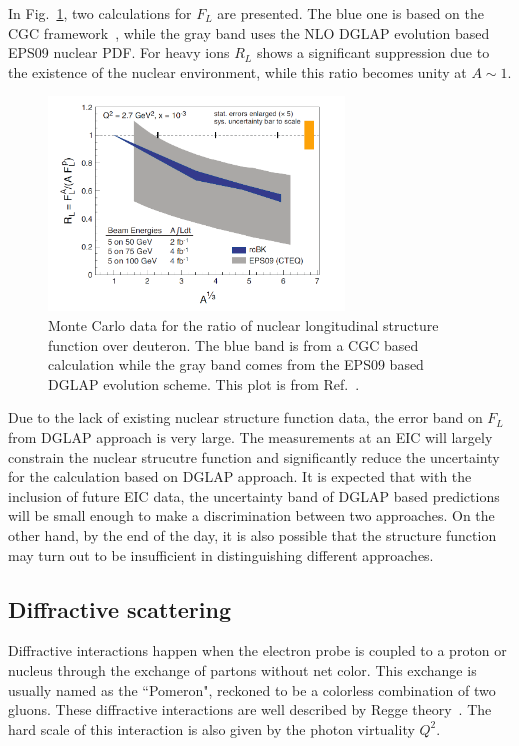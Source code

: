 In Fig.~\ref{fig:F_L}, two calculations for $F_L$ are presented. The blue one is
based on the CGC framework~\cite{Albacete:2009fh}, while the gray band uses the
NLO DGLAP evolution based EPS09 nuclear PDF. For heavy ions $R_L$ shows a
significant suppression due to the existence of the nuclear environment,
while this ratio becomes unity at $A\sim 1$. 
\begin{figure}
\centering
\includegraphics[width=0.7\textwidth]{plots/chpt3/FL_WP.png}
\caption[Longitudinal structure function ratio of different nuclear types over deuteron]{
Monte Carlo data for the ratio of nuclear longitudinal structure function over deuteron. The blue band is from a CGC based calculation while the gray band comes from the EPS09 based DGLAP evolution scheme. This plot is from Ref.~\cite{Accardi:2012qut}.}
\label{fig:F_L}
\end{figure}
Due to the lack of existing nuclear structure function data, the error band on $F_L$ from 
DGLAP approach is very large. The measurements at an EIC will largely constrain the nuclear strucutre
function and significantly reduce the uncertainty for the calculation based on DGLAP approach.
It is expected that with the inclusion of future EIC data, the uncertainty band of DGLAP based
predictions will be small enough to make a discrimination between two approaches.
On the other hand, by the end of the day, it is also possible that the structure function may turn out to be insufficient 
in distinguishing different approaches.


\subsection{Diffractive scattering}
Diffractive interactions happen when the electron probe is coupled to a proton
or nucleus through the exchange of partons without net color. This exchange is
usually named as the ``Pomeron", reckoned to be a colorless combination of two
gluons. These diffractive interactions are well described by Regge
theory~\cite{Irving:1977ea}. The hard scale of this interaction is also given by
the photon virtuality $Q^{2}$.

